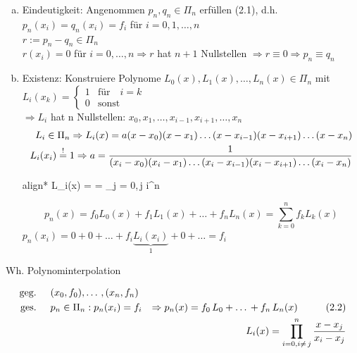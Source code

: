 \begin{enumerate}[(a)]
  \item Eindeutigkeit: Angenommen $p_n, q_n \in \Pi_n$ erfüllen (2.1), d.h. $p_n(x_i)=q_n(x_i)=f_i $ für $i=0,1,\ldots,n$\\
    $r := p_n - q_n \in \Pi_n$ \\
    $r(x_i) = 0$ für $i = 0, \ldots, n \Rightarrow r$ hat $n + 1$ Nullstellen
    $\Rightarrow r \equiv 0 \Rightarrow p_n \equiv q_n$
  \item Existenz: Konstruiere Polynome $L_0(x), L_1(x), \ldots, L_n(x) \in \Pi_n$ mit\\
    $L_i(x_k)=\begin{cases} 1 & \mbox{für } \mbox{ $i = k$} \\ 
      0 & \mbox{sonst} \end{cases}$ \\
    $\Rightarrow L_i$ hat n Nullstellen: $x_0, x_1, \ldots, x_{i-1}, x_{i+1}, \ldots, x_n$
		\begin{align*}    
		L_i \in \Pi_n \Rightarrow L_i(x) = a(x-x_0)(x-x_1)\ldots(x-x_{i-1})(x-x_{i+1})\ldots(x-x_n)\\
    L_i(x_i) \overset{!}{=} 1 \Rightarrow
      a = \frac{1}{(x_i-x_0)(x_i-x_1)\ldots(x_i-x_{i-1})(x_i-x_{i+1})\ldots(x_i-x_n)}\\
    \end{align*}
		\begin{empheq}[innerbox=\fbox,right=\Leftarrow{\text{LAGRANGE-POLYNOME}}]{align*}
		\Rightarrow L_i(x) =  = 
      \prod\limits_{j = 0,\,j \neq i}^n  \\
		\end{empheq}
    \begin{equation*}
      \tag{2.2}
      p_n(x) = f_0 L_0(x) + f_1 L_1(x) + \ldots + f_n L_n(x) = 
      \sum\limits_{k = 0}^n f_k L_k(x)
    \end{equation*}
    $p_n(x_i) = 0 + 0 + \ldots + f_i\underbrace{L_i(x_i)}_{1} + 0 + \ldots = f_i$\\
\end{enumerate}

Wh. Polynominterpolation

\begin{align*}
\text{geg.} \hspace{0.5cm} & (x_0,f_0),\ldots\,,(x_n,f_n) \\
\text{ges.} \hspace{0.5cm} & p_n \in \Pi_n:p_n(x_i)=f_i & \Rightarrow p_n(x) = f_0\,L_0+\ldots\,+f_n\,L_n(x) \hspace{1cm} (2.2)\\
& & L_i(x)=\prod\limits_{i=0,i\neq\,j}^n \frac{x-x_j}{x_i-x_j}
\end{align*}

